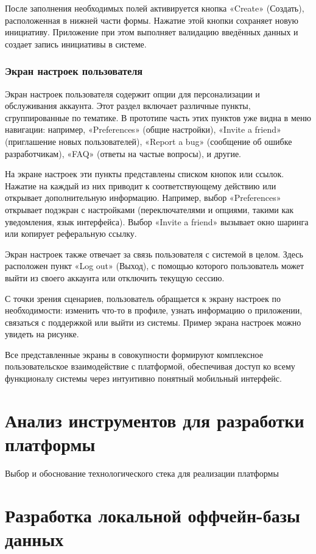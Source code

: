 \documentclass[
    candidate, %
    subf, %
    dotsinheaders=false,
]{disser}
\begin{document}
После заполнения необходимых полей активируется кнопка «Create» (Создать), расположенная в нижней части формы. Нажатие этой кнопки сохраняет новую инициативу. Приложение при этом выполняет валидацию введённых данных и создает запись инициативы в системе.

\subsubsection{Экран настроек пользователя}

Экран настроек пользователя содержит опции для персонализации и обслуживания аккаунта. Этот раздел включает различные пункты, сгруппированные по тематике. В прототипе часть этих пунктов уже видна в меню навигации: например, «Preferences» (общие настройки), «Invite a friend» (приглашение новых пользователей), «Report a bug» (сообщение об ошибке разработчикам), «FAQ» (ответы на частые вопросы), и другие.

На экране настроек эти пункты представлены списком кнопок или ссылок. Нажатие на каждый из них приводит к соответствующему действию или открывает дополнительную информацию. Например, выбор «Preferences» открывает подэкран с настройками (переключателями и опциями, такими как уведомления, язык интерфейса). Выбор «Invite a friend» вызывает окно шаринга или копирует реферальную ссылку.

Экран настроек также отвечает за связь пользователя с системой в целом. Здесь расположен пункт «Log out» (Выход), с помощью которого пользователь может выйти из своего аккаунта или отключить текущую сессию.

С точки зрения сценариев, пользователь обращается к экрану настроек по необходимости: изменить что-то в профиле, узнать информацию о приложении, связаться с поддержкой или выйти из системы. Пример экрана настроек можно увидеть на рисунке.

Все представленные экраны в совокупности формируют комплексное пользовательское взаимодействие с платформой, обеспечивая доступ ко всему функционалу системы через интуитивно понятный мобильный интерфейс.

\section{Анализ инструментов для разработки платформы}
Выбор и обоснование технологического стека для реализации платформы


\section{Разработка локальной оффчейн-базы данных}
\end{document}
